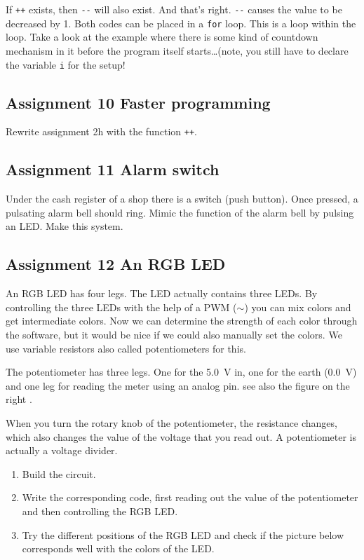 \documentclass{arduino}
\begin{document}
If \lstinline{++} exists, then \lstinline{--} will also exist. And that's right. \lstinline{--} causes the value to be decreased by 1. Both codes can be placed in a \lstinline{for} loop. This is a loop within the loop. Take a look at the example where there is some kind of countdown mechanism in it before the program itself starts\dots (note, you still have to declare the variable \lstinline{i} for the setup!

\subsection{Assignment 10 Faster programming}

Rewrite assignment 2h with the function \lstinline{++}.

\subsection{Assignment 11 Alarm switch}

Under the cash register of a shop there is a switch (push button). Once pressed, a pulsating alarm bell should ring. Mimic the function of the alarm bell by pulsing an LED. Make this system.

\newpage
\subsection{Assignment 12 An RGB LED}


An RGB LED has four legs. The LED actually contains three LEDs. By controlling the three LEDs with the help of a PWM ($\sim$) you can mix colors and get intermediate colors. Now we can determine the strength of each color through the software, but it would be nice if we could also manually set the colors. We use variable resistors also called potentiometers for this.

The potentiometer has three legs. One for the \SI{5.0}{\volt} in, one for the earth (\SI{0.0}{\volt}) and one leg for reading the meter using an analog pin. see also the figure on the right .

When you turn the rotary knob of the potentiometer, the resistance changes, which also changes the value of the voltage that you read out. A potentiometer is actually a voltage divider.

\begin{enumerate}[label={\alph*})]
\item Build the circuit.

\item Write the corresponding code, first reading out the value of the potentiometer and then controlling the RGB LED.

\item Try the different positions of the RGB LED and check if the picture below corresponds well with the colors of the LED.
\end{enumerate}
\end{document}
